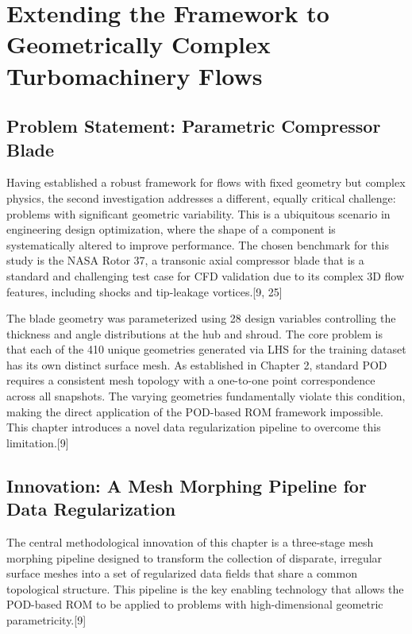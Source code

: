 \documentclass[12pt, a4paper]{report}
\begin{document}
\chapter{Extending the Framework to Geometrically Complex Turbomachinery Flows}

\section{Problem Statement: Parametric Compressor Blade}
Having established a robust framework for flows with fixed geometry but complex physics, the second investigation addresses a different, equally critical challenge: problems with significant geometric variability. This is a ubiquitous scenario in engineering design optimization, where the shape of a component is systematically altered to improve performance. The chosen benchmark for this study is the NASA Rotor 37, a transonic axial compressor blade that is a standard and challenging test case for CFD validation due to its complex 3D flow features, including shocks and tip-leakage vortices.[9, 25]

The blade geometry was parameterized using 28 design variables controlling the thickness and angle distributions at the hub and shroud. The core problem is that each of the 410 unique geometries generated via LHS for the training dataset has its own distinct surface mesh. As established in Chapter 2, standard POD requires a consistent mesh topology with a one-to-one point correspondence across all snapshots. The varying geometries fundamentally violate this condition, making the direct application of the POD-based ROM framework impossible. This chapter introduces a novel data regularization pipeline to overcome this limitation.[9]

\section{Innovation: A Mesh Morphing Pipeline for Data Regularization}
The central methodological innovation of this chapter is a three-stage mesh morphing pipeline designed to transform the collection of disparate, irregular surface meshes into a set of regularized data fields that share a common topological structure. This pipeline is the key enabling technology that allows the POD-based ROM to be applied to problems with high-dimensional geometric parametricity.[9]
\end{document}
